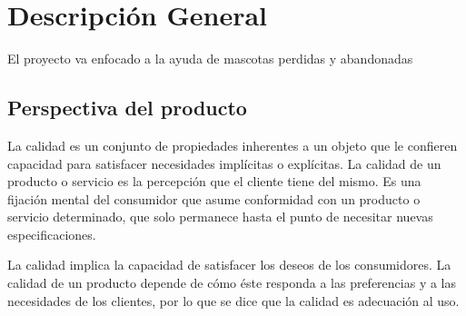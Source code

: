 \chapter{Descripción General}
El proyecto va enfocado a la ayuda de mascotas perdidas y abandonadas
\section{Perspectiva del producto}
La calidad es un conjunto de propiedades inherentes a un objeto que le confieren
capacidad para satisfacer necesidades implícitas o explícitas.
La calidad de un producto o servicio es la percepción que el cliente tiene del mismo.
Es una fijación mental del consumidor que asume conformidad con un producto o
servicio determinado, que solo permanece hasta el punto de necesitar nuevas
especificaciones.

La calidad implica la capacidad de satisfacer los deseos de los consumidores. La
calidad de un producto depende de cómo éste responda a las preferencias y a las
necesidades de los clientes, por lo que se dice que la calidad es adecuación al uso.
